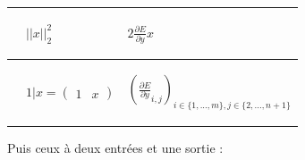\begin{center}
\begin{tabular}{|m{3.5cm}|m{2.9cm}|m{5.2cm}|}
\hline
\begin{center}\end{center} & \begin{center}$||x||_2^2$\end{center} & \begin{center}$2\frac{\partial E}{\partial y}x$\end{center} \\ 
\hline
\begin{center}\end{center} & \begin{center}$1|x = \begin{pmatrix}1 & x\end{pmatrix}$\end{center} & \begin{center}$(\frac{\partial E}{\partial y}_{i, j})_{i \in \{1, ..., m\}, j \in \{2, ..., n+1\}}$\end{center} \\ 
\hline
\end{tabular}
\end{center}

Puis ceux à deux entrées et une sortie :

